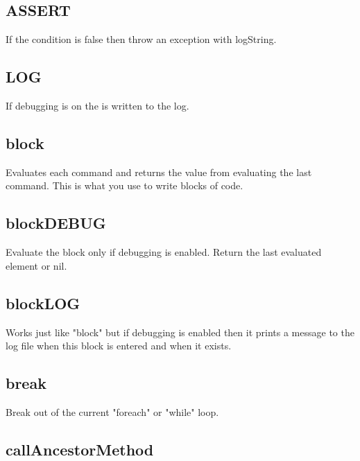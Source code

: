 \begin{itemize}
\subsection{ASSERT}

  If the condition is false then throw an exception with logString.

\subsection{LOG}

  If debugging is on the  is written to the log.

\subsection{block}

  Evaluates each command and returns the value  from evaluating the last command. This is what you use to write blocks of code.

\subsection{blockDEBUG}

  Evaluate the block only if debugging is enabled.
  Return the last evaluated element or nil.

\subsection{blockLOG}

  Works just like "block" but if debugging is enabled then it prints a message to the log file when this block is
  entered and when it exists.

\subsection{break}

  Break out of the current "foreach" or "while" loop.

\subsection{callAncestorMethod}


\end{itemize}
